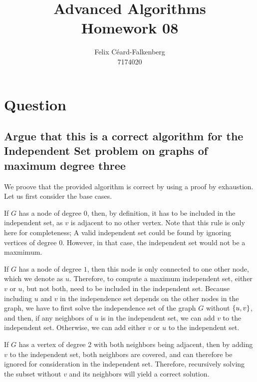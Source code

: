 \documentclass{article}
\title{Advanced Algorithms\\Homework 08}
\author{Felix Céard-Falkenberg\\7174020}
\begin{document}
\section{Question}

\subsection{\textbf{Argue that this is a correct algorithm for the Independent Set problem on graphs of maximum
degree three}}

We proove that the provided algorithm is correct by using a proof by exhaustion.
Let us first consider the base cases.

If $G$ has a node of degree $0$, then, by definition, it has to be included in the independent set, as $v$ is adjacent to no other vertex. Note that this rule is only here for completeness; A valid independent set could be found by ignoring vertices of degree $0$. However, in that case, the independent set would not be a maxmimum.

If $G$ has a node of degree $1$, then this node is only connected to one other node, which we denote as $u$. Therefore, to compute a maximum independent set, either $v$ or $u$, but not both, need to be included in the independent set. 
Because including $u$ and $v$ in the independence set depends on the other nodes in the graph, we have to first solve the independence set of the graph $G$ without $\left\{ u, v \right\}$, and then, if any neighbors of $u$ is in the independent set, we can add $v$ to the independent set. Otherwise, we can add either $v$ or $u$ to the independent set.

If $G$ has a vertex of degree 2 with both neighbors being adjacent, then by adding $v$ to the independent set, both neighbors are covered, and can therefore be ignored for consideration in the independent set. Therefore, recursively solving the subset without $v$ and its neighbors will yield a correct solution.





\end{document}
